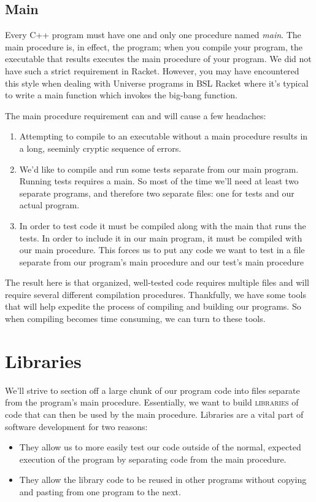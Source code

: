 \documentclass[]{tufte-handout}
\begin{document}
\subsection{Main}

Every C++ program must have one and only one procedure named \textit{main}.  The main procedure is, in effect, the program; when you compile your program, the executable that results executes the main procedure of your program. We did not have such a strict requirement in Racket.  However, you may have encountered this style when dealing with Universe programs in BSL Racket where it's typical to write a main function which invokes the big-bang function. 

The main procedure requirement can and will cause a few headaches:
\begin{enumerate}
\item Attempting to compile to an executable without a main procedure results in a long, seeminly cryptic sequence of errors.  
\item We'd like to compile and run some tests separate from our main program.  Running tests requires a main.  So most of the time we'll need at least two separate programs, and therefore two separate files: one for tests and our actual program.
\item In order to test code it must be compiled along with the main that runs the tests. In order to include it in our main program, it must be compiled with our main procedure.  This forces us to put any code we want to test in a file separate from our program's main procedure and our test's main procedure
\end{enumerate}
The result here is that organized, well-tested code requires multiple files and will require several different compilation procedures.  Thankfully, we have some tools that will help expedite the process of compiling and building our programs. So when compiling becomes time consuming, we can turn to these tools.

\section{Libraries}

We'll strive to section off a large chunk of our program code into files separate from the program's main procedure.  Essentially, we want to build \textsc{libraries} of code that can then be used by the main procedure.  Libraries are a vital part of software development for two reasons:
\begin{itemize}
\item They allow us to more easily test our code outside of the normal, expected execution of the program by separating code from the main procedure.
\item They allow the library code to be reused in other programs without copying and pasting from one program to the next. 
\end{itemize}
\end{document}
